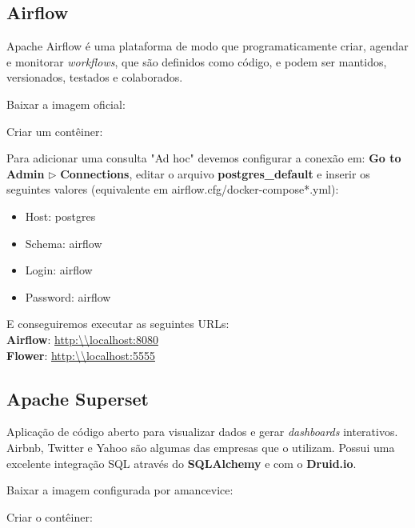 \documentclass[a4paper,11pt]{article}
\begin{document}
\subsection{Airflow}
Apache Airflow é uma plataforma de modo que programaticamente criar, agendar e monitorar \textit{workflows}, que são definidos como código, e podem ser mantidos, versionados, testados e colaborados.

Baixar a imagem oficial: \\

Criar um contêiner: \\

Para adicionar uma consulta "Ad hoc" devemos configurar a conexão em: \textbf{Go to Admin} $\triangleright$ \textbf{Connections}, editar o arquivo \textbf{postgres\_default} e inserir os seguintes valores (equivalente em airflow.cfg/docker-compose*.yml): \vspace{-1em}
\begin{itemize}[noitemsep]
	\item Host: postgres
	\item Schema: airflow
	\item Login: airflow
	\item Password: airflow
\end{itemize}

E conseguiremos executar as seguintes URLs: \\
\textbf{Airflow}: \url{http:\\localhost:8080} \\
\textbf{Flower}: \url{http:\\localhost:5555}

\subsection{Apache Superset}
Aplicação de código aberto para visualizar dados e gerar \textit{dashboards} interativos. Airbnb, Twitter e Yahoo são algumas das empresas que o utilizam. Possui uma excelente integração SQL através do \textbf{SQLAlchemy} e com o \textbf{Druid.io}.

Baixar a imagem configurada por amancevice: \\

Criar o contêiner: \\
\end{document}
